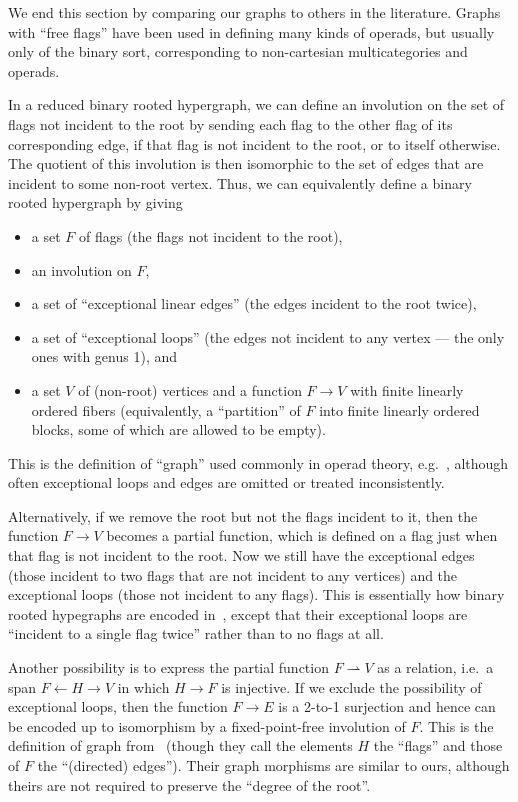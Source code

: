 \documentclass{article}
\theoremstyle{definition}
\theoremstyle{remark}
\let\ot\leftarrow
\begin{document}
We end this section by comparing our graphs to others in the literature.
Graphs with ``free flags'' have been used in defining many kinds of operads, but usually only of the binary sort, corresponding to non-cartesian multicategories and operads.

In a reduced binary rooted hypergraph, we can define an involution on the set of flags not incident to the root by sending each flag to the other flag of its corresponding edge, if that flag is not incident to the root, or to itself otherwise.
The quotient of this involution is then isomorphic to the set of edges that are incident to some non-root vertex.
Thus, we can equivalently define a binary rooted hypergraph by giving
\begin{itemize}
\item a set $F$ of flags (the flags not incident to the root),
\item an involution on $F$,
\item a set of ``exceptional linear edges'' (the edges incident to the root twice),
\item a set of ``exceptional loops'' (the edges not incident to any vertex --- the only ones with genus 1), and
\item a set $V$ of (non-root) vertices and a function $F\to V$ with finite linearly ordered fibers (equivalently, a ``partition'' of $F$ into finite linearly ordered blocks, some of which are allowed to be empty).
\end{itemize}
This is the definition of ``graph'' used commonly in operad theory, e.g.~\cite{bm:gen-opds,km:gwcqceg,costello:ainf,mms:wheeled-props,gk:modular-operads}, although often exceptional loops and edges are omitted or treated inconsistently.

Alternatively, if we remove the root but not the flags incident to it, then the function $F\to V$ becomes a partial function, which is defined on a flag just when that flag is not incident to the root.
Now we still have the exceptional edges (those incident to two flags that are not incident to any vertices) and the exceptional loops (those not incident to any flags).
This is essentially how binary rooted hypegraphs are encoded in~\cite{bb:htapm}, except that their exceptional loops are ``incident to a single flag twice'' rather than to no flags at all.

Another possibility is to express the partial function $F\rightharpoonup V$ as a relation, i.e.\ a span $F \ot H \to V$ in which $H\to F$ is injective.
If we exclude the possibility of exceptional loops, then the function $F\to E$ is a 2-to-1 surjection and hence can be encoded up to isomorphism by a fixed-point-free involution of $F$.
This is the definition of graph from~\cite{jk:feynman} (though they call the elements $H$ the ``flags'' and those of $F$ the ``(directed) edges'').
Their graph morphisms are similar to ours, although theirs are not required to preserve the ``degree of the root''.
\end{document}
